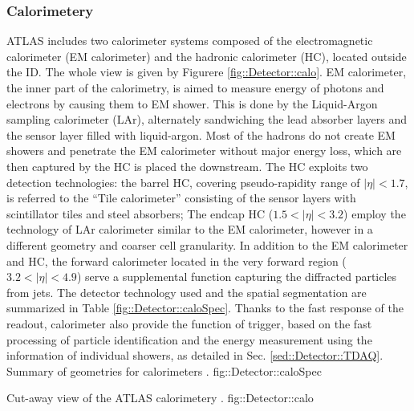 \subsubsection{Calorimetery}
ATLAS includes two calorimeter systems composed of the electromagnetic calorimeter (EM calorimeter) and the hadronic calorimeter (HC), located outside the ID. 
The whole view is given by Figurere \ref{fig::Detector::calo}.
EM calorimeter, the inner part of the calorimetry, is aimed to measure energy of photons and electrons by causing them to EM shower. 
This is done by the Liquid-Argon sampling calorimeter (LAr), alternately sandwiching the lead absorber layers and the sensor layer filled with liquid-argon.
Most of the hadrons do not create EM showers and penetrate the EM calorimeter without major energy loss, which are then captured by the HC is placed the downstream. The HC exploits two detection technologies: the barrel HC, covering pseudo-rapidity range of $|\eta|<1.7$, is referred to the ``Tile calorimeter'' consisting of the sensor layers with scintillator tiles and steel absorbers; The endcap HC ($1.5<|\eta|<3.2$) employ the technology of LAr calorimeter similar to the EM calorimeter, however in a different geometry and coarser cell granularity. In addition to the EM calorimeter and HC, the forward calorimeter located in the very forward region ($3.2<|\eta|<4.9$) serve a supplemental function capturing the diffracted particles from jets. The detector technology used and the spatial segmentation are summarized in Table \ref{fig::Detector::caloSpec}.
Thanks to the fast response of the readout, calorimeter also provide the function of trigger, based on the fast processing of particle identification and the energy measurement using the information of individual showers, as detailed in Sec. \ref{sed::Detector::TDAQ}. \\

\clearpage
{}
{Summary of geometries for calorimeters \cite{ATLAS_TDR}.}
{fig::Detector::caloSpec}
\clearpage


{Cut-away view of the ATLAS calorimetery \cite{ATLAS_exp}.}
{fig::Detector::calo}



